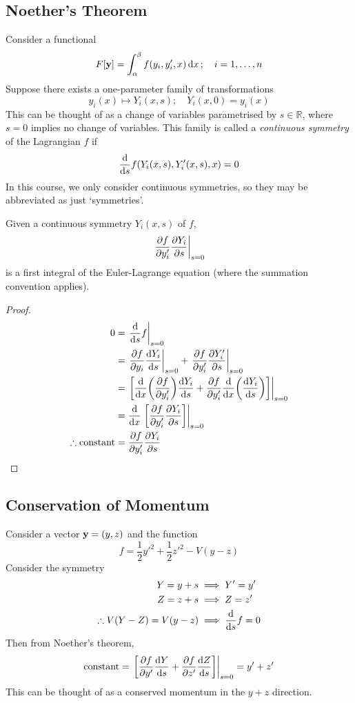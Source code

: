 \subsection{Noether's Theorem}
Consider a functional
\[
	F[\vb y] = \int_\alpha^\beta f(y_i, y_i', x) \dd{x};\quad i = 1,\dots,n
\]
Suppose there exists a one-parameter family of transformations
\[
	y_i(x) \mapsto Y_i(x,s);\quad Y_i(x,0) = y_i(x)
\]
This can be thought of as a change of variables parametrised by \( s \in \mathbb R \), where \( s = 0 \) implies no change of variables.
This family is called a \textit{continuous symmetry} of the Lagrangian \( f \) if
\[
	\dv{s} f(Y_i(x,s), Y_i'(x,s), x) = 0
\]
In this course, we only consider continuous symmetries, so they may be abbreviated as just `symmetries'.
\begin{theorem}
	Given a continuous symmetry \( Y_i(x,s) \) of \( f \),
	\[
		\eval{\pdv{f}{y_i'}\pdv{Y_i}{s}}_{s=0}
	\]
	is a first integral of the Euler-Lagrange equation (where the summation convention applies).
\end{theorem}
\begin{proof}
	\begin{align*}
		0                          & = \eval{\dv{s} f}_{s=0}                                                                           \\
		                           & = \eval{\pdv{f}{y_i} \dv{Y_i}{s}}_{s=0} + \eval{\pdv{f}{y_i'}\pdv{Y_i'}{s}}_{s=0}                 \\
		                           & = \eval{\qty[\dv{x} \qty(\pdv{f}{y_i'})\dv{Y_i}{s} + \pdv{f}{y_i'}\dv{x}\qty(\dv{Y_i}{s})]}_{s=0} \\
		                           & = \dv{x}\eval{\qty[\pdv{f}{y_i'}\pdv{Y_i}{s}]}_{s=0}                                              \\
		\therefore \text{constant} & = \pdv{f}{y_i'}\pdv{Y_i}{s}
	\end{align*}
\end{proof}

\subsection{Conservation of Momentum}
\begin{example}
	Consider a vector \( \vb y = (y,z) \) and the function
	\[
		f = \frac{1}{2}y'^2 + \frac{1}{2}z'^2 - V(y-z)
	\]
	Consider the symmetry
	\begin{align*}
		Y = y + s                  & \implies Y' = y'      \\
		Z = z + s                  & \implies Z = z'       \\
		\therefore V(Y-Z) = V(y-z) & \implies \dv{s} f = 0
	\end{align*}
	Then from Noether's theorem,
	\[
		\text{constant} = \eval{\qty[\pdv{f}{y'}\dv{Y}{s} + \pdv{f}{z'}\dv{Z}{s}]}_{s=0} = y' + z'
	\]
	This can be thought of as a conserved momentum in the \(y+z\) direction.
\end{example}

